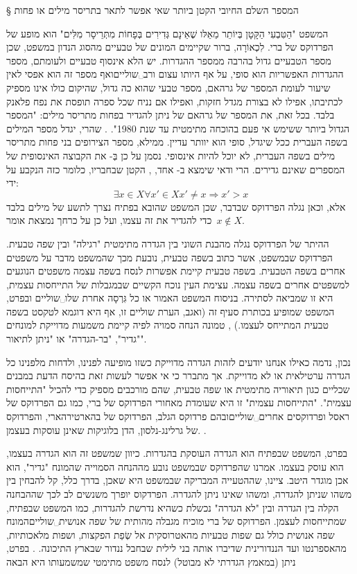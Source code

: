 § המספר השלם החיובי הקטן ביותר שאי אפשר לתאר בתריסר מילים או פחות

המשפט "הַטִּבְעִי הַקָּטָן בְּיוֹתֵר מֵאֵלּו שֶׁאֵינָם גְּדִירִים בְּפָחוֹת מִתְּרֵיסָר מִלִּים" הוא מופע של
הפרדוקס של ברי. לִכְאוֹרָה, ברור שקיימים המונים של טבעיים מהסוג הנדון במשפט, שכן
מספר הטבעיים גדול בהרבה ממספר ההגדרות. יש הלא אינסוף טבעיים ולעומתם, מספר
ההגדרות האפשריות הוא סופי, על אף היותו עצום ורב␣שוליים{ואף מספר זה הוא
אפסי לאין שיעור לעומת המספר של גרהאם, מספר טבעי שהוא כה גדול, שהיקום כולו אינו
מספיק לכתיבתו, אפילו לא בצורת מגדל חזקות, ואפילו אם נניח שכל ספרה תופסת את נפח
פלאנק בלבד. בכל זאת, את המספר של גרהאם של ניתן להגדיר בפחות מתריסר מילים:
"המספר הגדול ביותר ששימש אי פעם בהוכחה מתימטית עד שנת 1980".  }. שהרי, יגדל
מספר המילים בשפה העברית ככל שיגדל, סופי הוא יוותר עדיין. ממילא, מספר הצירופים
בני פחות מתריסר מילים בשפה העברית, לא יוכל להיות אינסופי.
נסמן על כן בְּ- את הקבוצה האינסופית של המספרים שאינם גדירים. הרי ודאי שימצא
ב- אחד, , הקטן שבחבריו, כלומר כזה  הנקבע על ידי: \[ ∃
x∈X\mbox{}∀ x'∈X\mbox{}x'≠x\mbox{}⇒ x'>x
\] אלא, וכאן נגלה הפרדוקס שבדבר, שכן המשפט שהובא בפתיח נצרך לתשע של מילים בלבד כדי להגדיר את  זה עצמו, ועל כן על כרחך נמצאת אומר~$x∉ X$.

ההיתר של הפרדוקס נגלה מהבנת השוני בין הגדרה מתימטית "רגילה" ובין שפה טבעית.
הפרדוקס שבמשפט, אשר כתוב בשפה טבעית, נובעת מכך שהמשפט מדבר על משפטים אחרים בשפה
הטבעית. בשפה טבעית קיימת אפשרות לנסח בשפה עצמה משפטים הנוגעים למשפטים אחרים
בשפה עצמה. עצימת העין נוכח הקשיים שבמגבלות של התייחסות עצמית, היא זו שמביאה
לסתירה.  בניסוח המשפט האמור או כל גִּרְסָה אחרת שלו␣שוליים{ ובפרט, המשפט
  שמופיע בכותרת סעיף זה (ואגב, הערת שוליים זו, אף היא דוגמא לטקסט בשפה טבעית
  המתייחס לעצמו.)
}, טמונה הנחה סמויה לפיה קיימת משמעות מדוייקת למונחים "גדיר", "בר-הגדרה" או "ניתן לתיאור".

נכון, נדמה כאילו אנחנו יודעים לזהות הגדרה מדוייקת כשזו מופיעה לפנינו, ולדחות
מלפנינו כל הגדרה ערטילאית או לא מדוייקת. אך מתברר כי אי אפשר לעשות זאת בהיסח
הדעת במבנים שכליים כגון תיאוריה מתימטית או שפה טבעית, שהם מורכבים מספיק כדי
להכיל "התייחסות עצמית". "התייחסות עצמית" זו היא שעומדת מאחורי הפרדוקס של ברי,
כמו גם הפרדוקס של ראסל  ופרדוקסים אחרים␣שוליים{ובהם פרדוקס הגלב, הפרדוקס של
בהארטירהארי, והפרדוקס של גרלינג-נלסון, הדן בלוגיקות שאינן עוסקות בעצמן. }.

בפרט, המשפט שבפתיח הוא הגדרה העוסקת בהגדרות. כיוון שמשפט זה הוא הגדרה בעצמו,
הוא עוסק בעצמו. אמרנו שהפרדוקס שבמשפט נובע מההנחה הסמוייה שהמונח "גדיר", הוא
אכן מוגדר היטב. ציינו, שההטעייה המבריקה שבמשפט היא שאכן, בדרך כלל, קל להבחין
בין משהו שניתן להגדרה, ומשהו שאינו ניתן להגדרה. הפרדקוס יופרך משנשים לב לכך
שההבחנה הקלה בין הגדרה ובין "לא הגדרה" נכשלת כשהיא נדרשת להגדרות, כמו המשפט
שבפתיח, שמתייחסות לעצמן. הפרדוקס של ברי מוכיח מגבלה מהותית של שפה
אנושית␣שוליים{המונח שפה אנושית כולל גם שפות טבעיות מהאטרוסקית אל שְׂפַת
הפקצות, ושפות מלאכותיות, מהאספרנטו ועד הננדורינית שדיברו אותה בני לילית שבחבל
ננדור שבארץ התיכונה.  }. בפרט, ניתן (במאמץ הגדרתי לא מבוטל) לנסח משפט מתימטי
שמשמעותו היא הבאה

